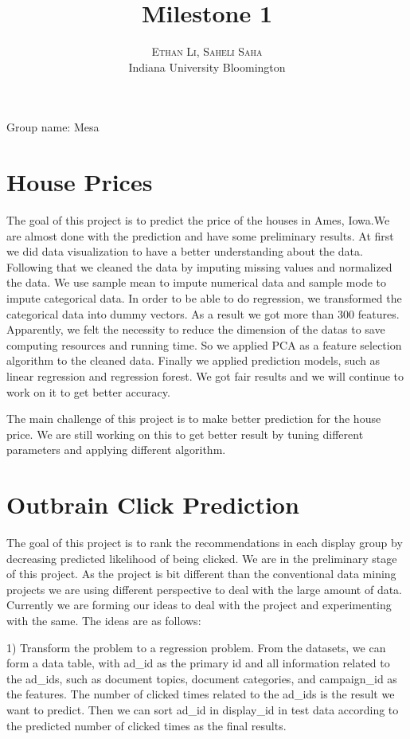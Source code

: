 \documentclass[paper=letter, fontsize=12pt]{article}
\title{\vspace{-15mm}\fontsize{24pt}{10pt}\selectfont\textbf{Milestone 1 }} %
\author{
\large
{\textsc{Ethan Li, Saheli Saha}}\\[2mm]
\normalsize {Indiana University Bloomington}\\ %
}
\date{}
\begin{document}
\maketitle %
\thispagestyle{fancy} %

Group name: Mesa

\section{House Prices}

The goal of this project is to predict the price of the houses in Ames, Iowa.We are almost done with the prediction and have some preliminary results. At first we did data visualization to have a better understanding about the data. Following that we cleaned the data by imputing missing values and normalized the data. We use sample mean to impute numerical data and sample mode to impute categorical data. In order to be able to do regression, we transformed the categorical data into dummy vectors. As a result we got more than 300 features. Apparently, we felt the necessity to reduce the dimension of the datas to save computing resources and running time. So we applied PCA as a feature selection algorithm to the cleaned data. Finally we applied prediction models, such as linear regression and regression forest. We got fair results and we will continue to work on it to get better accuracy. 

The main challenge of this project is to make better prediction for the house price. We are still working on this to get better result by tuning different parameters and applying different algorithm.

\section{Outbrain Click Prediction}

The goal of this project is to rank the recommendations in each display group by decreasing predicted likelihood of being clicked. We are in the preliminary stage of this project. As the project is bit different than the conventional data mining projects we are using different perspective to deal with the large amount of data. Currently we are forming our ideas to deal with the project and experimenting with the same. The ideas are as follows:

1) Transform the problem to a regression problem. From the datasets, we can form a data table, with ad\_id as the primary id and all information related to the ad\_ids, such as document topics, document categories, and campaign\_id as the features. The number of clicked times related to the ad\_ids is the result we want to predict. Then we can sort ad\_id in display\_id in test data according to the predicted number of clicked times as the final results. 
\end{document}
